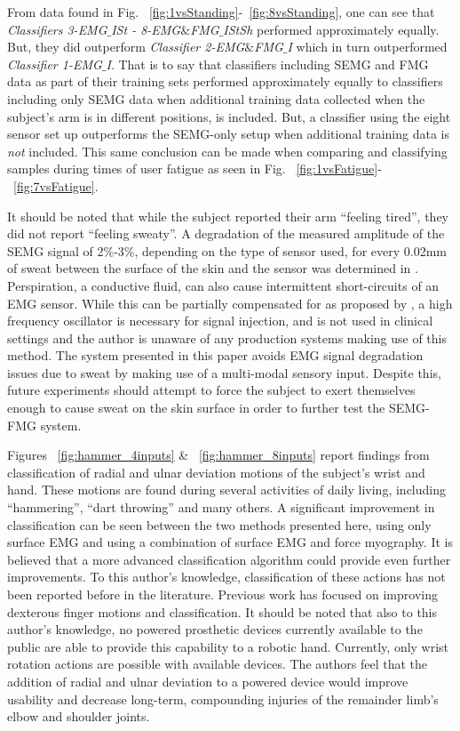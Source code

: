 \documentclass[twocolumn]{sagej}
\begin{document}
From data found in Fig. ~\ref{fig:1vsStanding}-~\ref{fig:8vsStanding}, one can see that \textit{Classifiers 3-EMG$\_$ISt - 8-EMG$\&$FMG$\_$IStSh} performed approximately equally.  But, they did outperform \textit{Classifier 2-EMG$\&$FMG$\_$I} which in turn outperformed \textit{Classifier 1-EMG$\_$I}.  That is to say that classifiers including SEMG and FMG data as part of their training sets performed approximately equally to classifiers including only SEMG data when additional training data collected when the subject's arm is in different positions, is included.  But, a classifier using the eight sensor set up outperforms the SEMG-only setup when additional training data is \textit{not} included.  This same conclusion can be made when comparing and classifying samples during times of user fatigue as seen in Fig. ~\ref{fig:1vsFatigue}-~\ref{fig:7vsFatigue}.   \par \noindent
It should be noted that while the subject reported their arm ``feeling tired'', they did not report ``feeling sweaty''.  A degradation of the measured amplitude of the SEMG signal of 2\%-3\%, depending on the type of sensor used, for every 0.02mm of sweat between the surface of the skin and the sensor was determined in \cite{Abdoli-Eramaki2012}.  Perspiration, a conductive fluid, can also cause intermittent short-circuits of an EMG sensor.  While this can be partially compensated for as proposed by \cite{Ray1983}, a high frequency oscillator is necessary for signal injection, and is not used in clinical settings and the author is unaware of any production systems making use of this method.  The system presented in this paper avoids EMG signal degradation issues due to sweat by making use of a multi-modal sensory input.  Despite this, future experiments should attempt to force the subject to exert themselves  enough to cause sweat on the skin surface in order to further test the SEMG-FMG system.   \par \noindent 
Figures ~\ref{fig:hammer_4inputs} \& ~\ref{fig:hammer_8inputs} report findings from classification of radial and ulnar deviation motions of the subject's wrist and hand.  These motions are found during several activities of daily living, including ``hammering'', ``dart throwing'' and many others.  A significant improvement in classification can be seen between the two methods presented here, using only surface EMG and using a combination of surface EMG and force myography.  It is believed that a more advanced classification algorithm could provide even further improvements. To this author's knowledge, classification of these actions has not been reported before in the literature.  Previous work has focused on improving dexterous finger motions and classification.  It should be noted that also to this author's knowledge, no powered prosthetic devices currently available to the public are able to provide this capability to a robotic hand. Currently, only  wrist rotation actions are possible with available devices. The authors feel that the addition of radial and ulnar deviation to a powered device would improve usability and decrease long-term, compounding injuries of the remainder limb's elbow and shoulder joints.\par \noindent
\end{document}
